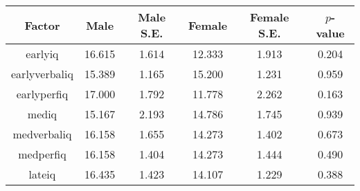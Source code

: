 \begin{longtable}{c c c c c c}
\toprule
\textbf{Factor} & \textbf{Male} & \textbf{Male S.E.}  & \textbf{Female} & \textbf{Female S.E.} & \textbf{$ p $-value} \\
\midrule
earlyiq & 16.615 & 1.614 &  12.333 & 1.913 & 0.204 \\
earlyverbaliq & 15.389 & 1.165 &  15.200 & 1.231 & 0.959 \\
earlyperfiq & 17.000 & 1.792 &  11.778 & 2.262 & 0.163 \\
mediq & 15.167 & 2.193 &  14.786 & 1.745 & 0.939 \\
medverbaliq & 16.158 & 1.655 &  14.273 & 1.402 & 0.673 \\
medperfiq & 16.158 & 1.404 &  14.273 & 1.444 & 0.490 \\
lateiq & 16.435 & 1.423 &  14.107 & 1.229 & 0.388 \\
\bottomrule
\end{longtable}
